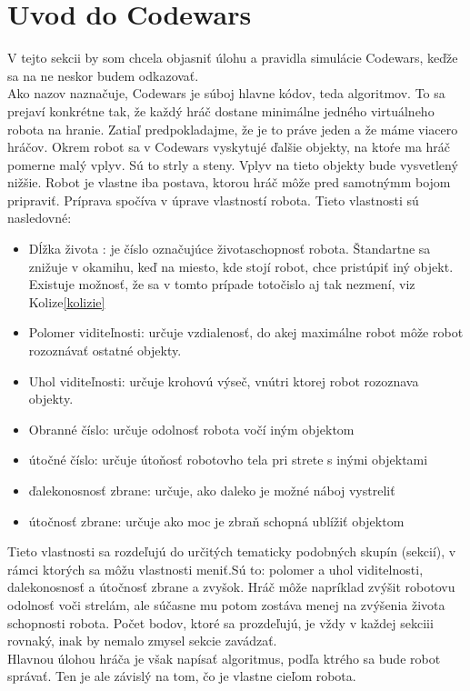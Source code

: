 \section{Uvod do Codewars}
V tejto sekcii by som chcela objasniť úlohu a pravidla simulácie Codewars, keďže sa na ne neskor budem odkazovať. \\ 
Ako nazov naznačuje, Codewars je súboj hlavne kódov, teda algoritmov. To sa prejaví konkrétne tak, že každý hráč dostane minimálne jedného virtuálneho robota na hranie. Zatiaľ predpokladajme, že je to práve jeden a že máme viacero hráčov. Okrem robot sa v Codewars vyskytujé ďalšie objekty, na ktoŕe ma hráč pomerne malý vplyv. Sú to strly a steny. Vplyv na tieto objekty bude vysvetlený nižšie. Robot je vlastne iba postava, ktorou hráč môže pred samotnýmm bojom pripraviť. Príprava spočíva v úprave vlastností robota. Tieto vlastnosti sú nasledovné:\begin{itemize}
\item Dĺžka života : je číslo označujúce životaschopnosť robota. Štandartne sa znižuje v okamihu, keď na miesto, kde stojí robot, chce pristúpiť iný objekt. Existuje možnosť, že sa v tomto prípade totočislo aj tak nezmení, viz Kolize\ref{kolizie} 
\item Polomer viditeľnosti: určuje vzdialenosť, do akej maximálne robot môže robot rozoznávať ostatné objekty.
\item Uhol viditeľnosti: určuje krohovú výseč, vnútri ktorej robot rozoznava objekty.
\item Obranné číslo: určuje odolnosť robota vočí iným objektom
\item útočné číslo: určuje útoňosť robotovho tela pri strete s inými objektami
\item ďalekonosnosť zbrane: určuje, ako daleko je možné náboj vystreliť
\item útočnosť zbrane: určuje ako moc je zbraň schopná ublížiť objektom
\end{itemize}
Tieto vlastnosti sa rozdeľujú do určitých tematicky podobných skupín (sekcií), v rámci ktorých sa môžu vlastnosti meniť.Sú to: {polomer a uhol viditelnosti}, {dalekonosnosť a útočnosť zbrane} a {zvyšok}. Hráč môže napríklad zvýšit robotovu odolnosť voči strelám, ale súčasne mu potom zostáva menej na zvýšenia života schopnosti robota. Počet bodov, ktoré sa prozdeľujú, je vždy v každej sekciii rovnaký, inak by nemalo zmysel sekcie zavádzať. \\Hlavnou úlohou hráča je však napísať algoritmus, podľa ktrého sa bude robot správať. Ten je ale závislý na tom, čo je vlastne cieľom robota.\\
